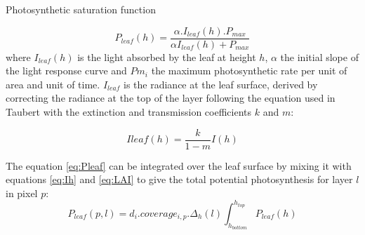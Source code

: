 \begin{marginfigure}
\label{fig:derivaives}
\caption{Photosynthetic saturation function}
\end{marginfigure}

\begin{equation}\label{eq:Pleaf}
P_{leaf}(h) = \frac{\alpha. I_{leaf}(h).P_{max}}{\alpha I_{leaf}(h)+P_{max}}
\end{equation}
where $I_{leaf}(h)$ is the light absorbed by the leaf at height $h$, $\alpha$ the initial slope of the light response curve and $Pm_{i}$ the maximum photosynthetic rate per unit of area and unit of time.
$I_{leaf}$ is the radiance at the leaf surface, derived by correcting the radiance at the top of the layer following the equation used in Taubert with the extinction and transmission coefficients $k$ and $m$:

\begin{equation}
I{leaf}(h) = \frac{k}{1-m}I(h)
\end{equation}

The equation \eqref{eq:Pleaf} can be integrated over the leaf surface by mixing it with equations \eqref{eq:Ih} and \eqref{eq:LAI} to give the total potential photosynthesis for layer $l$ in pixel $p$:
\begin{equation}\label{Ppixlay}
P_{leaf}(p,l) = d_{i}.coverage_{i, p}.\Delta_{h}(l)\int_{h_{bottom}}^{h_{top}}P_{leaf}(h)
\end{equation}
%

